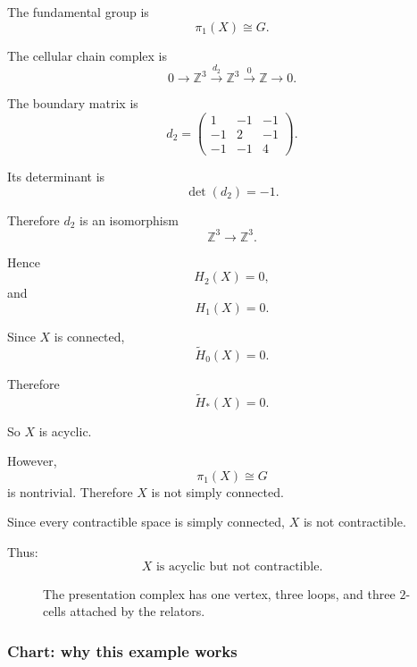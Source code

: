 \documentclass[12pt,a4paper]{article}
\theoremstyle{notespace}
\begin{document}
The fundamental group is
\[
\pi_1(X)\cong G.
\]

The cellular chain complex is
\[
0
\longrightarrow
\mathbb Z^3
\xrightarrow{d_2}
\mathbb Z^3
\xrightarrow{0}
\mathbb Z
\longrightarrow
0.
\]

The boundary matrix is
\[
d_2=
\begin{pmatrix}
	1 & -1 & -1\\
	-1 & 2 & -1\\
	-1 & -1 & 4
\end{pmatrix}.
\]

Its determinant is
\[
\det(d_2)=-1.
\]

Therefore \(d_2\) is an isomorphism
\[
\mathbb Z^3\to \mathbb Z^3.
\]

Hence
\[
H_2(X)=0,
\]
and
\[
H_1(X)=0.
\]

Since \(X\) is connected,
\[
\widetilde H_0(X)=0.
\]

Therefore
\[
\widetilde H_*(X)=0.
\]

So \(X\) is acyclic.

However,
\[
\pi_1(X)\cong G
\]
is nontrivial. Therefore \(X\) is not simply connected.

Since every contractible space is simply connected, \(X\) is not contractible.

Thus:
\[
\boxed{
	X\text{ is acyclic but not contractible.}
}
\]

\begin{figure}[htbp]
	\centering
	\caption{The presentation complex has one vertex, three loops, and three \(2\)-cells attached by the relators.}
\end{figure}

\subsubsection*{Chart: why this example works}
\end{document}

